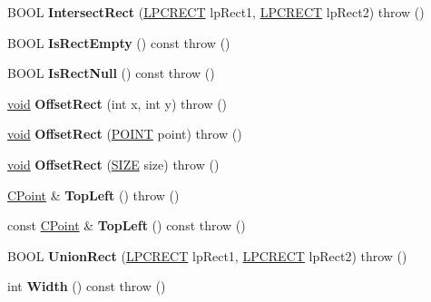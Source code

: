 \begin{DoxyCompactItemize}
B\+O\+OL {\bfseries Intersect\+Rect} (\hyperlink{structtag_r_e_c_t}{L\+P\+C\+R\+E\+CT} lp\+Rect1, \hyperlink{structtag_r_e_c_t}{L\+P\+C\+R\+E\+CT} lp\+Rect2)  throw ()
\item 
\mbox{\label{class_c_rect_af30b516112a74bec2f01052a04db0b09}} 
B\+O\+OL {\bfseries Is\+Rect\+Empty} () const  throw ()
\item 
\mbox{\label{class_c_rect_a2744b427b0d36ed5f021a5629062fad3}} 
B\+O\+OL {\bfseries Is\+Rect\+Null} () const  throw ()
\item 
\mbox{\label{class_c_rect_a78d7c57c3913fef2d8e56b6e264327ea}} 
\hyperlink{interfacevoid}{void} {\bfseries Offset\+Rect} (int x, int y)  throw ()
\item 
\mbox{\label{class_c_rect_a39df76bba775693699c1cf579f22935a}} 
\hyperlink{interfacevoid}{void} {\bfseries Offset\+Rect} (\hyperlink{structtag_p_o_i_n_t}{P\+O\+I\+NT} point)  throw ()
\item 
\mbox{\label{class_c_rect_a3d3cb1240b505e5a0e8e582451e28bca}} 
\hyperlink{interfacevoid}{void} {\bfseries Offset\+Rect} (\hyperlink{structtag_s_i_z_e}{S\+I\+ZE} size)  throw ()
\item 
\mbox{\label{class_c_rect_ab1738fe7ddb2d5cafffcf3974d09a169}} 
\hyperlink{class_c_point}{C\+Point} \& {\bfseries Top\+Left} ()  throw ()
\item 
\mbox{\label{class_c_rect_a460822e1d6b8396c775750eb2f9fd615}} 
const \hyperlink{class_c_point}{C\+Point} \& {\bfseries Top\+Left} () const  throw ()
\item 
\mbox{\label{class_c_rect_a8dd2d65e039c153a0f0042d1fe4c9671}} 
B\+O\+OL {\bfseries Union\+Rect} (\hyperlink{structtag_r_e_c_t}{L\+P\+C\+R\+E\+CT} lp\+Rect1, \hyperlink{structtag_r_e_c_t}{L\+P\+C\+R\+E\+CT} lp\+Rect2)  throw ()
\item 
\mbox{\label{class_c_rect_a3f9bdbbb2fdcb5587f9167b3ccb2fa5d}} 
int {\bfseries Width} () const  throw ()
\item 
\mbox{\label{class_c_rect_a487ae31717f3ef992c1fef31ad0d1efa}} 

\end{DoxyCompactItemize}
